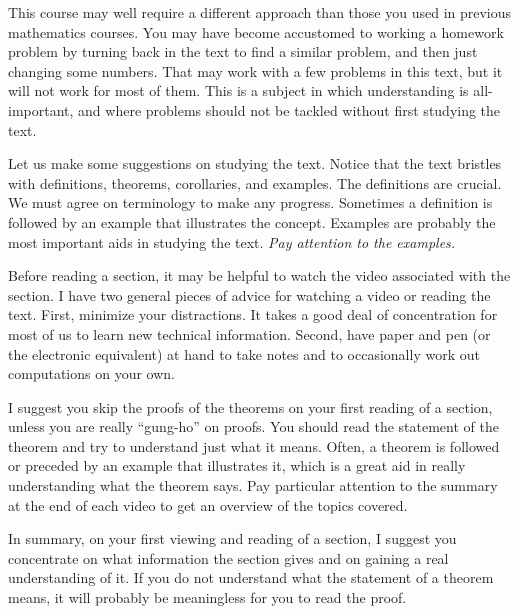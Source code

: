 \documentclass[11pt,oneside]{article}
\begin{document}
\BookNarrativetrue

\begin{BookBody}


\noindent This course may well require a different approach than those you used in previous mathematics courses. You may have become accustomed to working a homework problem by turning back in the text to find a similar problem, and then just changing some numbers. That may work with a few problems in this text, but it will not work for most of them. This is a subject in which understanding is all-important, and where problems should not be tackled without first studying the text.

Let us make some suggestions on studying the text. Notice that the text bristles with definitions, theorems, corollaries, and examples. The definitions are crucial. We must agree on terminology to make any progress. Sometimes a definition is followed by an example that illustrates the concept. Examples are probably the most important aids in studying the text.\textit{ Pay attention to the examples.}

Before reading a section, it may be helpful to watch the video associated with the section. I have two general pieces of advice for watching a video or reading the text. First, minimize your distractions. It takes a good deal of concentration for most of us to learn new technical information. Second, have paper and pen (or the electronic equivalent) at hand to take notes and to occasionally work out computations on your own.

I suggest you skip the proofs of the theorems on your first reading of a section, unless you are really “gung-ho” on proofs. You should read the statement of the theorem and try to understand just what it means. Often, a theorem is followed or preceded by an example that illustrates it, which is a great aid in really understanding what the theorem says. Pay particular attention to the summary at the end of each video to get an overview of the topics covered.

In summary, on your first viewing and reading of a section, I suggest you concentrate on what information the section gives and on gaining a real understanding of it. If you do not understand what the statement of a theorem means, it will probably be meaningless for you to read the proof.


\end{BookBody}
\end{document}
